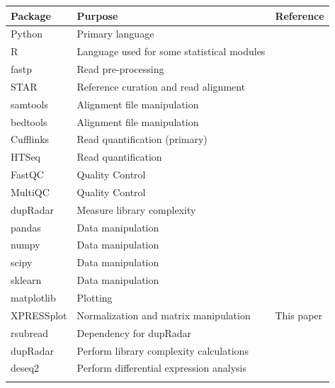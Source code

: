 \documentclass[11pt, a4paper, oneside]{article}
\begin{document}
\begin{tabular}{p{2.4cm}p{7.5cm}p{3cm}}
 \textbf{Package} & \textbf{Purpose} & \textbf{Reference} \\
 \hline
 Python & Primary language & \\
 \hline
 R & Language used for some statistical modules & \\
 \hline
 fastp & Read pre-processing & \cite{fastp} \\
 \hline
 STAR & Reference curation and read alignment & \cite{star} \\
 \hline
 samtools & Alignment file manipulation & \cite{samtools} \\
 \hline
 bedtools & Alignment file manipulation & \cite{bedtools} \\
 \hline
 Cufflinks & Read quantification (primary) & \cite{cufflinks} \\
 \hline
 HTSeq & Read quantification & \cite{htseq} \\
 \hline
 FastQC & Quality Control & \cite{fastqc} \\
 \hline
 MultiQC & Quality Control & \cite{multiqc} \\
 \hline
 dupRadar & Measure library complexity & \cite{dupradar} \\
 \hline
 pandas & Data manipulation & \cite{pandas} \\
 \hline
 numpy & Data manipulation & \cite{numpy1, numpy2} \\
 \hline
 scipy & Data manipulation & \cite{scipy} \\
 \hline
 sklearn & Data manipulation & \cite{sklearn} \\
 \hline
 matplotlib & Plotting & \cite{matplotlib} \\
 \hline
 XPRESSplot & Normalization and matrix manipulation & This paper \\
 \hline
 rsubread & Dependency for dupRadar &  \\
 \hline
 dupRadar & Perform library complexity calculations & \cite{dupradar} \\
 \hline
 deseq2 & Perform differential expression analysis & \cite{deseq2} \\
 \label{Tab:software_pipe}
\end{tabular}
\newline
\end{document}

